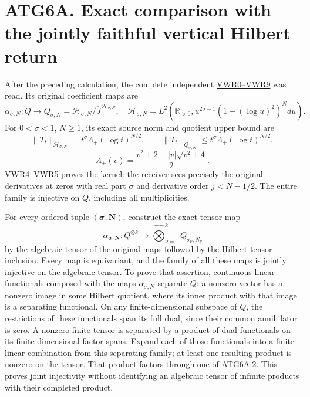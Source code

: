 \section{ATG6A. Exact comparison with the jointly faithful vertical
Hilbert
return}\label{atg6a.-exact-comparison-with-the-jointly-faithful-vertical-hilbert-return}

After the preceding calculation, the complete independent
\href{https://github.com/KokunoYumeto/zeta-function-research-reader/blob/main/workbenches/splitzero-tandem/continuations/20260925-full-source-tensor-and-original-divisor/counterfactual/FULL_VERTICAL_WEIGHT_RETURN.md}{VWR0--VWR9}
was read. Its original coefficient maps are \[
\alpha_{\sigma,N}:Q\longrightarrow
Q_{\sigma,N}=\mathcal H_{\sigma,N}/\overline J^{\,\mathcal H_{\sigma,N}},
\quad
\mathcal H_{\sigma,N}=
L^2(\mathbb R_{>0},u^{2\sigma-1}(1+(\log u)^2)^Ndu).
\] For \(0<\sigma<1\), \(N\ge1\), its exact source norm and quotient
upper bound are \[
\|T_t\|_{\mathcal H_{\sigma,N}}
=t^\sigma\Lambda_+(\log t)^{N/2},\qquad
\|T_t\|_{Q_{\sigma,N}}\le
t^\sigma\Lambda_+(\log t)^{N/2},
\] \[
\Lambda_+(v)=\frac{v^2+2+|v|\sqrt{v^2+4}}2.
\tag{ATG6A.1}
\] VWR4--VWR5 proves the kernel: the receiver sees precisely the
original derivatives at zeros with real part \(\sigma\) and derivative
order \(j<N-1/2\). The entire family is injective on \(Q\), including
all multiplicities.

For every ordered tuple \((\boldsymbol\sigma,\boldsymbol N)\), construct
the exact tensor map \[
\alpha_{\boldsymbol\sigma,\boldsymbol N}:
Q^{\otimes k}\longrightarrow
\widehat{\bigotimes}_{\nu=1}^k Q_{\sigma_\nu,N_\nu}
\tag{ATG6A.2}
\] by the algebraic tensor of the original maps followed by the Hilbert
tensor inclusion. Every map is equivariant, and the family of all these
maps is jointly injective on the algebraic tensor. To prove that
assertion, continuous linear functionals composed with the maps
\(\alpha_{\sigma,N}\) separate \(Q\): a nonzero vector has a nonzero
image in some Hilbert quotient, where its inner product with that image
is a separating functional. On any finite-dimensional subspace of \(Q\),
the restrictions of these functionals span its full dual, since their
common annihilator is zero. A nonzero finite tensor is separated by a
product of dual functionals on its finite-dimensional factor spans.
Expand each of those functionals into a finite linear combination from
this separating family; at least one resulting product is nonzero on the
tensor. That product factors through one of ATG6A.2. This proves joint
injectivity without identifying an algebraic tensor of infinite products
with their completed product.

